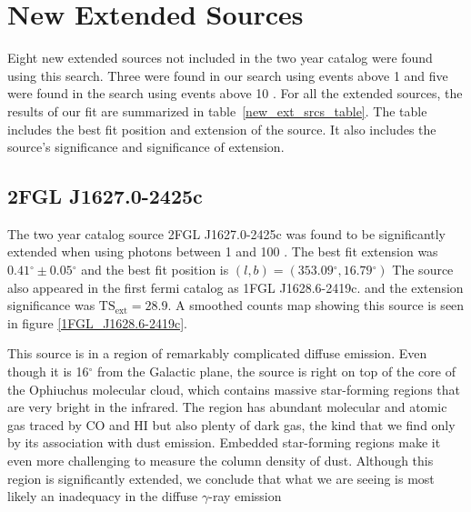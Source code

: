 \documentclass[12pt,preprint]{aastex}
\newcommand{\gev}{\text{GeV}\xspace}
\newcommand{\tsext}{{\ensuremath{\text{TS}_\text{ext}}}\xspace}
\renewcommand{\deg}{\ensuremath{^\circ}\xspace}
\begin{document}
\section{New Extended Sources}
\label{new_ext_srcs_section}


Eight new extended sources not included in the two year catalog were
found using this search. Three were found in our search using events
above 1 \gev and five were found in the search using events
above 10 \gev.
For all the extended sources, the results of our fit are summarized in
table~\ref{new_ext_srcs_table}. The table includes the best fit position and
extension of the source. It also includes the source's significance and
significance of extension.


\subsection{2FGL J1627.0-2425c}


The two year catalog source 2FGL J1627.0-2425c was found to be significantly
extended when using photons between 1 \gev and 100 \gev.  The best
fit extension was $0.41\deg\pm0.05\deg$ and the best fit position is
$(l,b)=(353.09\deg, 16.79\deg)$ The source also appeared in the first
fermi catalog as 1FGL J1628.6-2419c.  and the extension significance
was $\tsext=28.9$.  A smoothed counts map showing this source is seen
in figure \ref{1FGL_J1628.6-2419c}.

This source is in a region of remarkably complicated diffuse emission.
Even though it is 16\deg from the Galactic plane,
the source is right on top of the core of the Ophiuchus molecular cloud,
which contains massive star-forming regions that are very bright
in the infrared.  The region has abundant molecular and atomic gas
traced by CO and HI but also plenty of dark gas, the kind that
we find only by its association with dust emission.
Embedded star-forming regions make it even more challenging to measure
the column density of dust.
Although this region is significantly extended, we conclude that what we
are seeing is most likely an inadequacy in the diffuse $\gamma$-ray emission
\end{document}
